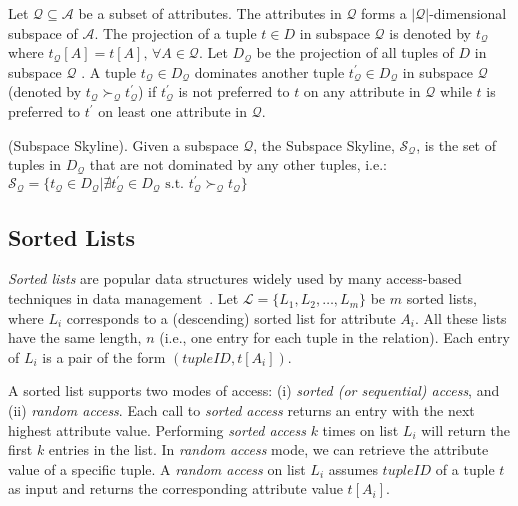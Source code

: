 \vspace{1mm}
 Let $\mathcal{Q} \subseteq \mathcal{A}$ be a subset of attributes. The attributes in $\mathcal{Q}$ forms a $|\mathcal{Q}|$-dimensional subspace of $\mathcal{A}$. The projection of a tuple $t \in D$ in subspace $\mathcal{Q}$ is denoted by $t_{\mathcal{Q}}$ where $t_{\mathcal{Q}}[A] = t[A], \, \forall A \in \mathcal{Q}$. Let $D_{\mathcal{Q}}$ be the projection of all tuples of $D$ in subspace $\mathcal{Q}$ . A tuple $t_{\mathcal{Q}} \in D_{\mathcal{Q}}$ dominates another tuple $t^\prime_{\mathcal{Q}} \in D_{\mathcal{Q}}$ in subspace $\mathcal{Q}$ (denoted by $t_{\mathcal{Q}} \succ_{\mathcal{Q}} t^\prime_{\mathcal{Q}}$) if $t^\prime_\mathcal{Q}$ is not preferred to $t$ on any attribute in $\mathcal{Q}$ while $t$ is preferred to $t^\prime$ on least one attribute in $\mathcal{Q}$.

\begin{definition}{(Subspace Skyline).}
Given a subspace $\mathcal{Q}$, the Subspace Skyline, $\mathcal{S_\mathcal{Q}}$, is the set of tuples in $D_{\mathcal{Q}}$ that are not dominated by any other tuples, i.e.: $\mathcal{S_\mathcal{Q}} = \{t_{\mathcal{Q}} \in D_{\mathcal{Q}} | \nexists t^\prime_{\mathcal{Q}} \in D_{\mathcal{Q}} \mbox{ s.t. } t^\prime_{\mathcal{Q}} \succ_{\mathcal{Q}} t_{\mathcal{Q}}\}$
\end{definition}

\subsection{Sorted Lists}
{\em Sorted lists} are popular data structures widely used by many access-based techniques in data management~\cite{fagin1996combining,fagin2003optimal}.
Let $\mathcal{L} = \{ L_1, L_2, \ldots, L_m \}$ be $m$ sorted lists, where $L_i$ corresponds to a (descending) sorted list for attribute $A_i$. All these lists have the same length, $n$ (i.e., one entry for each tuple in the relation). Each entry of $L_i$ is a pair of the form $(tupleID, t[A_i])$. %


A sorted list supports two modes of access: (i) \textit{sorted (or sequential) access}, and (ii) \textit{random access}. Each call to \textit{sorted access} returns an entry with the next highest attribute value. Performing \textit{sorted access} $k$ times on list $L_i$ will return the first $k$ entries in the list. In \textit{random access} mode, we can retrieve the attribute value of a specific tuple. A \textit{random access} on list $L_i$ assumes $tupleID$ of a tuple $t$ as input and returns the corresponding attribute value $t[A_i]$. 


